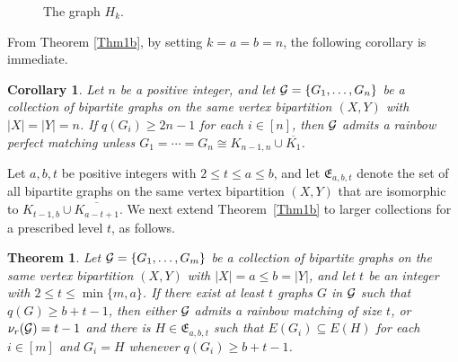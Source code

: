 \documentclass[11pt,a4paper]{article}
\newtheorem{theorem}{Theorem}[section]
\newtheorem{cor}{Corollary}[section]
\theoremstyle{definition}
\numberwithin{equation}{section}
\begin{document}
\begin{figure}[htbp]
\begin{center}
\caption{The graph $H_k$.}
\label{fig:extremal}
\end{center}
\end{figure}

From Theorem \ref{Thm1b}, by setting $k=a=b=n$, the following corollary is immediate.

\begin{cor}
\label{cor1b}
Let $n$ be a positive integer, and let ${\cal G}=\{G_1,\ldots,G_n\}$ be a collection of bipartite graphs on the same vertex bipartition $(X,Y)$ with $|X|=|Y|=n$. If $q(G_i)\ge2n-1$ for each $i\in[n]$, then ${\cal G}$ admits a rainbow perfect matching unless $G_1=\cdots=G_n\cong K_{n-1,n}\cup\overline{K_1}$.
\end{cor}

Let $a,b,t$ be positive integers with $2\le t\le a\le b$, and let $\mathfrak E_{a,b,t}$ denote the set of all bipartite graphs on the same vertex bipartition $(X,Y)$ that are isomorphic to $K_{t-1,b}\cup\overline{K_{a-t+1}}$. We next extend Theorem~\ref{Thm1b} to larger collections for a prescribed level $t$, as follows.

\begin{theorem}
\label{Thm-high-members}
Let ${\cal G}=\{G_1,\ldots,G_m\}$ be a collection of bipartite graphs on the same vertex bipartition $(X,Y)$ with $|X|=a\le b=|Y|$, and let $t$ be an integer with $2\le t\le\min\{m,a\}$. If there exist at least $t$ graphs $G$ in ${\cal G}$  such that $q(G)\ge b+t-1$, then either ${\cal G}$ admits a rainbow matching of size $t$, or $\nu_r({\cal G})=t-1$ and there is $H\in\mathfrak E_{a,b,t}$ such that $E(G_i)\subseteq E(H)$ for each $i\in[m]$ and $G_i=H$ whenever $q(G_i)\ge b+t-1$.
\end{theorem}
\end{document}
